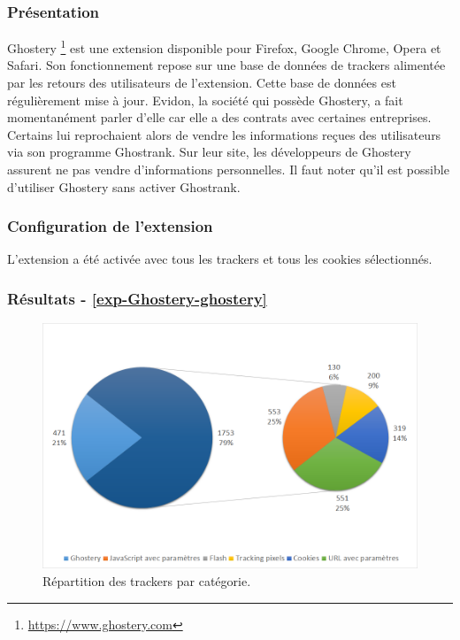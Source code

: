 \subsubsection{Présentation}
Ghostery \footnote{\url{https://www.ghostery.com}} est une extension disponible pour Firefox, Google Chrome, Opera et Safari. Son fonctionnement repose sur une base de données de trackers alimentée par les retours des utilisateurs de l'extension. Cette base de données est régulièrement mise à jour. Evidon, la société qui possède Ghostery, a fait momentanément parler d'elle car elle a des contrats avec certaines entreprises. Certains lui reprochaient alors de vendre les informations reçues des utilisateurs via son programme Ghostrank. Sur leur site, les développeurs de Ghostery assurent ne pas vendre d'informations personnelles. Il faut noter qu'il est possible d'utiliser Ghostery sans activer Ghostrank.

\subsubsection{Configuration de l'extension}
L'extension a été activée avec tous les trackers et tous les cookies sélectionnés.

\subsubsection{Résultats - \autoref{exp-Ghostery-ghostery}}
\begin{figure}[!h]
	\centering
	\includegraphics[scale=.6]{resultats/ANALYSES/Images/Ghostery-Ghostery.png}
	\caption{\label{exp-Ghostery-ghostery}Répartition des trackers par catégorie.}
\end{figure}

